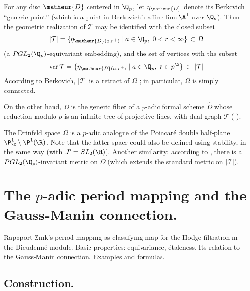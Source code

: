 \begin{para}
 For any disc $\matheur{D}$ centered in $\Q_p$, let $\eta_\matheur{D}$
 denote its Berkovich 
 ``generic point'' (which is a point in Berkovich's affine line $\A^1$
 over $\Q_p$). Then the geometric realization of 
 $\mathcal{T}$ may be identified with the closed subset 
 \begin{equation*}
  |\mathcal{T}|= \{\eta_{\matheur{D}(a,r^+)} \mid a\in \Q_p,\;0<r<\infty\}
  \,\subset \,\Omega
 \end{equation*}
 (a $PGL_2(\Q_p)$-equivariant embedding), and the set of vertices with
 the subset 
\begin{equation*}
 \mathrm{ver}\, \mathcal{T}=
  \{\eta_{\matheur{D}(a,r^+)} \mid a\in \Q_p,\;r\in p^\Z\}\, \subset
  \,|\mathcal{T}| 
\end{equation*}
 According to Berkovich, $|\mathcal{T}|$ is a retract of $\Omega$
 \cite{staagonf}; in particular, $\Omega$ is simply connected.

 On the other hand, $\Omega$ is the generic fiber of a $p$-adic formal
 scheme $\hat\Omega$ whose reduction modulo $p$ is an 
 infinite tree of projective lines, with dual graph $\mathcal{T}$ (\cf
 \cite[I]{updcds}).


 The Drinfeld space $\Omega$ is a $p$-adic analogue of the Poincar\'e
 double half-plane $\P^1_{\C}\setminus \P^1(\R)$. Note that the latter
 space could also be defined using stability, in the same way (with
 $J'=SL_2(\R)$).  Another similarity: according to \cite{staagonf},
 there is a $PGL_2(\Q_p)$-invariant metric on $\Omega$ (which 
 extends the standard metric on $|\mathcal{T}|$). 
\end{para}


\newpage
\section{The $p$-adic period mapping and the Gauss-Manin connection.}
\label{sec:6}

\begin{abst}
 Rapoport-Zink's period mapping as classifying map for the Hodge
 filtration in the Dieudonn\'e module. Basic properties: equivariance,
 \'etaleness. Its relation to the Gauss-Manin connection. Examples and
 formulas.
\end{abst}

\subsection{Construction.}\label{sub:6.1} 

